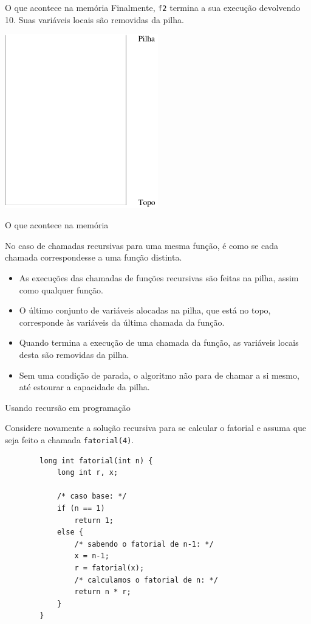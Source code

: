 \documentclass[handout]{beamer}
\newcommand{\cod}[1]{\texttt{#1}}
\begin{document}
\begin{frame}[fragile]{O que acontece na memória}
    Finalmente, \cod{f2} termina a sua execução devolvendo 10. Suas variáveis locais são removidas da pilha.
    \begin{center}
        \includegraphics[width=0.5\textwidth]{figs/pilha0}
    \end{center}
\end{frame}

\begin{frame}[fragile]{O que acontece na memória}

    No caso de chamadas recursivas para uma mesma função, é como se cada chamada correspondesse a uma função distinta.
    \begin{itemize}[<+->]
        \item As execuções das chamadas de funções recursivas são feitas na pilha, assim como qualquer função.
        \item O último conjunto de variáveis alocadas na pilha, que está no topo, corresponde às variáveis da última chamada da função.
        \item Quando termina a execução de uma chamada da função, as variáveis locais desta são removidas da pilha.
        \item Sem uma condição de parada, o algoritmo não para de chamar a si mesmo, até estourar a capacidade da pilha.
    \end{itemize}
\end{frame}

\begin{frame}[fragile]{Usando recursão em programação}

    Considere novamente a solução recursiva para se calcular o fatorial e assuma que seja feito a chamada \cod{fatorial(4)}.
    \begin{verbatim}
        long int fatorial(int n) {
            long int r, x;

            /* caso base: */
            if (n == 1)
                return 1;
            else {
                /* sabendo o fatorial de n-1: */
                x = n-1;
                r = fatorial(x);
                /* calculamos o fatorial de n: */
                return n * r;
            }
        }
    \end{verbatim}
\end{frame}
\end{document}
